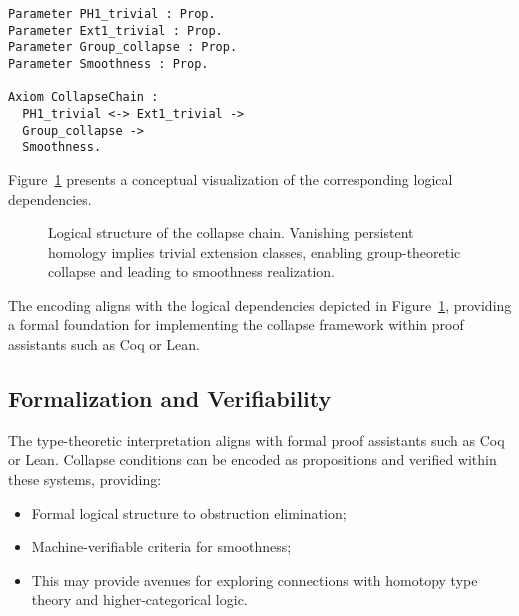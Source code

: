 \documentclass[11pt]{article}
\begin{document}
\begin{lstlisting}[language=Coq]
Parameter PH1_trivial : Prop.
Parameter Ext1_trivial : Prop.
Parameter Group_collapse : Prop.
Parameter Smoothness : Prop.

Axiom CollapseChain :
  PH1_trivial <-> Ext1_trivial ->
  Group_collapse ->
  Smoothness.
\end{lstlisting}

Figure~\ref{fig:typechain} presents a conceptual visualization of the corresponding logical dependencies.

\begin{figure}[h]
\centering
{}
\caption{Logical structure of the collapse chain. Vanishing persistent homology implies trivial extension classes, enabling group-theoretic collapse and leading to smoothness realization.}
\label{fig:typechain}
\end{figure}

The encoding aligns with the logical dependencies depicted in Figure~\ref{fig:typechain}, providing a formal foundation for implementing the collapse framework within proof assistants such as Coq or Lean.


\subsection{Formalization and Verifiability}

The type-theoretic interpretation aligns with formal proof assistants such as Coq or Lean. Collapse conditions can be encoded as propositions and verified within these systems, providing:

\begin{itemize}
    \item Formal logical structure to obstruction elimination;
    \item Machine-verifiable criteria for smoothness;
    \item This may provide avenues for exploring connections with homotopy type theory and higher-categorical logic.
\end{itemize}
\end{document}
